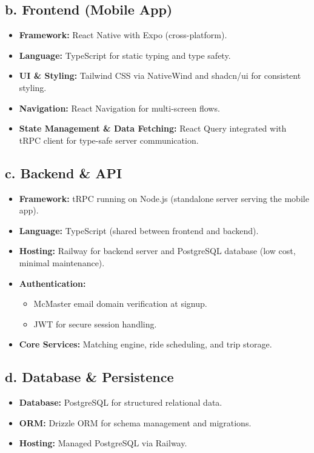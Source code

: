 \documentclass{article}
\begin{document}
\subsection*{b. Frontend (Mobile App)}
\begin{itemize}
    \item \textbf{Framework:} React Native with Expo (cross-platform).
    \item \textbf{Language:} TypeScript for static typing and type safety.
    \item \textbf{UI \& Styling:} Tailwind CSS via NativeWind and shadcn/ui for consistent styling.
    \item \textbf{Navigation:} React Navigation for multi-screen flows.
    \item \textbf{State Management \& Data Fetching:} React Query integrated with tRPC client for type-safe server communication.
\end{itemize}

\subsection*{c. Backend \& API}
\begin{itemize}
    \item \textbf{Framework:} tRPC running on Node.js (standalone server serving the mobile app).
    \item \textbf{Language:} TypeScript (shared between frontend and backend).
    \item \textbf{Hosting:} Railway for backend server and PostgreSQL database (low cost, minimal maintenance).
    \item \textbf{Authentication:} 
    \begin{itemize}
        \item McMaster email domain verification at signup.
        \item JWT for secure session handling.
    \end{itemize}
    \item \textbf{Core Services:} Matching engine, ride scheduling, and trip storage.
\end{itemize}

\subsection*{d. Database \& Persistence}
\begin{itemize}
    \item \textbf{Database:} PostgreSQL for structured relational data.
    \item \textbf{ORM:} Drizzle ORM for schema management and migrations.
    \item \textbf{Hosting:} Managed PostgreSQL via Railway.
\end{itemize}
\end{document}
